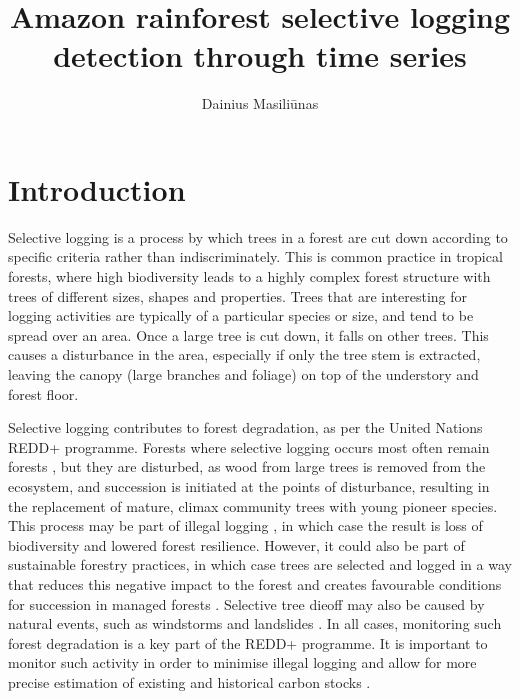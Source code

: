 \documentclass[a4paper,10pt]{article}
\title{Amazon rainforest selective logging detection through time series}
\author{Dainius Masiliūnas}
\begin{document}
\maketitle

\section{Introduction}

Selective logging is a process by which trees in a forest are cut down according to specific criteria rather than indiscriminately. This is common practice in tropical forests, where high biodiversity leads to a highly complex forest structure with trees of different sizes, shapes and properties. Trees that are interesting for logging activities are typically of a particular species or size, and tend to be spread over an area. Once a large tree is cut down, it falls on other trees. This causes a disturbance in the area, especially if only the tree stem is extracted, leaving the canopy (large branches and foliage) on top of the understory and forest floor.

Selective logging contributes to forest degradation, as per the United Nations \ac{REDD+} programme. Forests where selective logging occurs most often remain forests \citep{asner_condition_2006}, but they are disturbed, as wood from large trees is removed from the ecosystem, and succession is initiated at the points of disturbance, resulting in the replacement of mature, climax community trees with young pioneer species. This process may be part of illegal logging \citep{rutishauser_rapid_2015}, in which case the result is loss of biodiversity and lowered forest resilience. However, it could also be part of sustainable forestry practices, in which case trees are selected and logged in a way that reduces this negative impact to the forest and creates favourable conditions for succession in managed forests \citep{west_forest_2014, keller_4._2004}. Selective tree dieoff may also be caused by natural events, such as windstorms and landslides \citep{frolking_forest_2009}. In all cases, monitoring such forest degradation is a key part of the \ac{REDD+} programme. It is important to monitor such activity in order to minimise illegal logging and allow for more precise estimation of existing and historical carbon stocks \citep{piponiot_carbon_2016, pinard_simulated_2000}.
\end{document}
